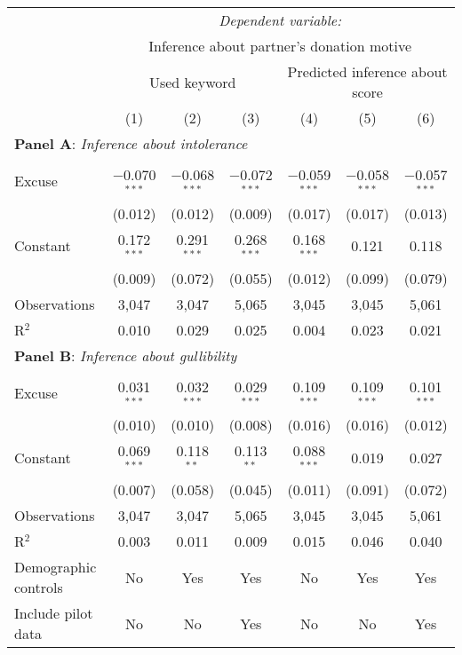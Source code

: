 \begin{table}[!htbp] \centering 
  \label{t:1-word}
\begin{threeparttable}
\begin{tabular}{@{\hspace{5pt}}l@{\hspace{5pt}}cccccc} 
\toprule 
 & \multicolumn{6}{c}{\textit{Dependent variable:}} \\ 
\cmidrule(rr){2-7} 
 & \multicolumn{6}{c}{Inference about partner's donation motive} \\ 
\cmidrule(lr){2-4} \cmidrule(lr){5-7}
 & \multicolumn{3}{c}{Used keyword} & \multicolumn{3}{c}{Predicted inference about score} \\ 
 & (1) & (2) & (3) & (4) & (5) & (6)\\ 
\midrule  
\midrule
\multicolumn{7}{l}{\textbf{Panel A}: \textit{Inference about intolerance}} \\
\midrule
\\[-2.1ex] Excuse & $-$0.070$^{***}$ & $-$0.068$^{***}$ & $-$0.072$^{***}$ & $-$0.059$^{***}$ & $-$0.058$^{***}$ & $-$0.057$^{***}$ \\ 
  & (0.012) & (0.012) & (0.009) & (0.017) & (0.017) & (0.013) \\ 
 \addlinespace 
 Constant & 0.172$^{***}$ & 0.291$^{***}$ & 0.268$^{***}$ & 0.168$^{***}$ & 0.121 & 0.118 \\ 
  & (0.009) & (0.072) & (0.055) & (0.012) & (0.099) & (0.079) \\ 
 \addlinespace 
\midrule  
Observations & 3,047 & 3,047 & 5,065 & 3,045 & 3,045 & 5,061 \\ 
R$^{2}$ & 0.010 & 0.029 & 0.025 & 0.004 & 0.023 & 0.021 \\ 
\midrule
\multicolumn{7}{l}{\textbf{Panel B}: \textit{Inference about gullibility}} \\
\midrule
\\[-2.1ex] Excuse & 0.031$^{***}$ & 0.032$^{***}$ & 0.029$^{***}$ & 0.109$^{***}$ & 0.109$^{***}$ & 0.101$^{***}$ \\ 
  & (0.010) & (0.010) & (0.008) & (0.016) & (0.016) & (0.012) \\ 
 \addlinespace 
 Constant & 0.069$^{***}$ & 0.118$^{**}$ & 0.113$^{**}$ & 0.088$^{***}$ & 0.019 & 0.027 \\ 
  & (0.007) & (0.058) & (0.045) & (0.011) & (0.091) & (0.072) \\ 
 \addlinespace 
\midrule  
Observations & 3,047 & 3,047 & 5,065 & 3,045 & 3,045 & 5,061 \\ 
R$^{2}$ & 0.003 & 0.011 & 0.009 & 0.015 & 0.046 & 0.040 \\ 
\midrule
Demographic controls & No & Yes & Yes & No & Yes & Yes \\ 
Include pilot data & No & No & Yes & No & No & Yes \\
\bottomrule 
\end{tabular} 
\end{threeparttable}
\end{table} 
